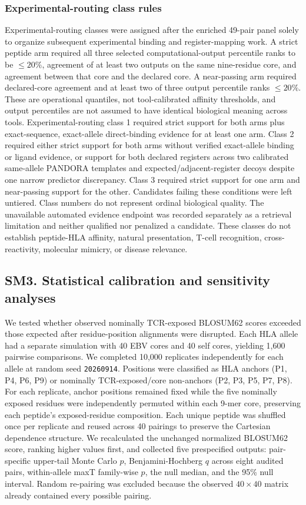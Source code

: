 \documentclass[11pt]{article}
\begin{document}
\subsubsection{Experimental-routing class rules}
Experimental-routing classes were assigned after the enriched 49-pair panel solely to organize subsequent experimental binding and register-mapping work. A strict peptide arm required all three selected computational-output percentile ranks to be $\leq20\%$, agreement of at least two outputs on the same nine-residue core, and agreement between that core and the declared core. A near-passing arm required declared-core agreement and at least two of three output percentile ranks $\leq20\%$. These are operational quantiles, not tool-calibrated affinity thresholds, and output percentiles are not assumed to have identical biological meaning across tools. Experimental-routing class 1 required strict support for both arms plus exact-sequence, exact-allele direct-binding evidence for at least one arm. Class 2 required either strict support for both arms without verified exact-allele binding or ligand evidence, or support for both declared registers across two calibrated same-allele PANDORA templates and expected/adjacent-register decoys despite one narrow predictor discrepancy. Class 3 required strict support for one arm and near-passing support for the other. Candidates failing these conditions were left untiered. Class numbers do not represent ordinal biological quality. The unavailable automated evidence endpoint was recorded separately as a retrieval limitation and neither qualified nor penalized a candidate. These classes do not establish peptide-HLA affinity, natural presentation, T-cell recognition, cross-reactivity, molecular mimicry, or disease relevance.

\subsection{SM3. Statistical calibration and sensitivity analyses}
We tested whether observed nominally TCR-exposed BLOSUM62 scores exceeded those expected after residue-position alignments were disrupted. Each HLA allele had a separate simulation with 40 EBV cores and 40 self cores, yielding 1,600 pairwise comparisons. We completed 10,000 replicates independently for each allele at random seed \texttt{20260914}. Positions were classified as HLA anchors (P1, P4, P6, P9) or nominally TCR-exposed/core non-anchors (P2, P3, P5, P7, P8). For each replicate, anchor positions remained fixed while the five nominally exposed residues were independently permuted within each 9-mer core, preserving each peptide's exposed-residue composition. Each unique peptide was shuffled once per replicate and reused across 40 pairings to preserve the Cartesian dependence structure. We recalculated the unchanged normalized BLOSUM62 score, ranking higher values first, and collected five prespecified outputs: pair-specific upper-tail Monte Carlo $p$, Benjamini-Hochberg $q$ across eight audited pairs, within-allele maxT family-wise $p$, the null median, and the 95\% null interval. Random re-pairing was excluded because the observed $40 \times 40$ matrix already contained every possible pairing.
\end{document}
